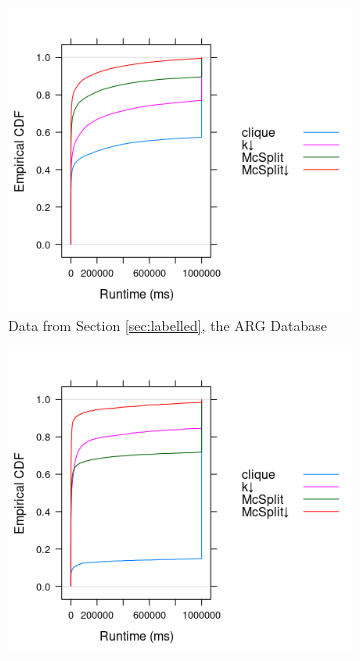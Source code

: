 \documentclass{l4proj}
\theoremstyle{definition}
\theoremstyle{remark}
\begin{document}
\begin{figure}
  \centering
  \begin{subfigure}[t]{0.49\textwidth}
    \centering
    \includegraphics[width=\textwidth]{images/ecdf_mcs.png}
    \caption{Data from Section \ref{sec:labelled}, the ARG Database}
    \label{fig:ecdf_unlabelled_mcs}
  \end{subfigure}
  \begin{subfigure}[t]{0.49\textwidth}
    \centering
    \includegraphics[width=\textwidth]{images/ecdf_sip.png}

\end{subfigure}
\end{figure}
\end{document}

